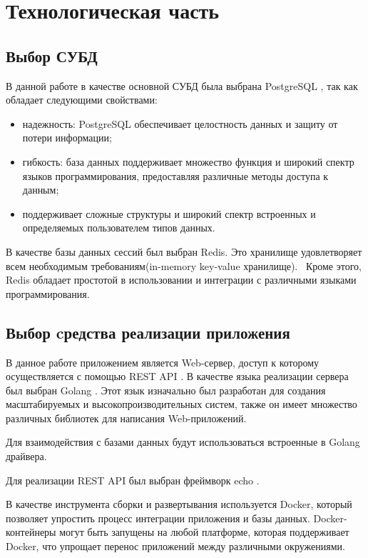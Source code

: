 \section{Технологическая часть}
\subsection{Выбор СУБД}

В данной работе в качестве основной СУБД была выбрана PostgreSQL \cite{postgres}, так как обладает следующими свойствами:

\begin{itemize}[leftmargin=1.6\parindent]
	\item надежность: PostgreSQL обеспечивает целостность данных и защиту от потери информации;
	\item гибкость: база данных поддерживает множество функция и широкий спектр языков программирования, предоставляя различные методы доступа к данным;
	\item поддерживает сложные структуры и широкий спектр встроенных и
	определяемых пользователем типов данных.
\end{itemize}

В качестве базы данных сессий был выбран Redis\cite{redis}. Это хранилище удовлетворяет всем необходимым требованиям(in-memory key-value хранилище).  Кроме этого, Redis обладает простотой в использовании и интеграции с различными языками программирования.

\subsection{Выбор cредства реализации приложения}
В данное работе приложением является Web-сервер, доступ  к которому осуществляется с помощью REST API \cite{rest-api}. В качестве языка реализации сервера был выбран Golang \cite{golang}. Этот язык изначально был  разработан для создания масштабируемых и высокопроизводительных систем, также он имеет множество различных библиотек для написания Web-приложений.

Для взаимодействия с базами данных будут использоваться встроенные в Golang драйвера.

Для реализации REST API был выбран фреймворк echo \cite{echo}.

В качестве инструмента сборки и развертывания используется Docker\cite{docker}, который позволяет  упростить процесс интеграции приложения и базы данных. Docker-контейнеры могут быть запущены на любой платформе, которая поддерживает Docker, что упрощает перенос приложений между различными окружениями.

